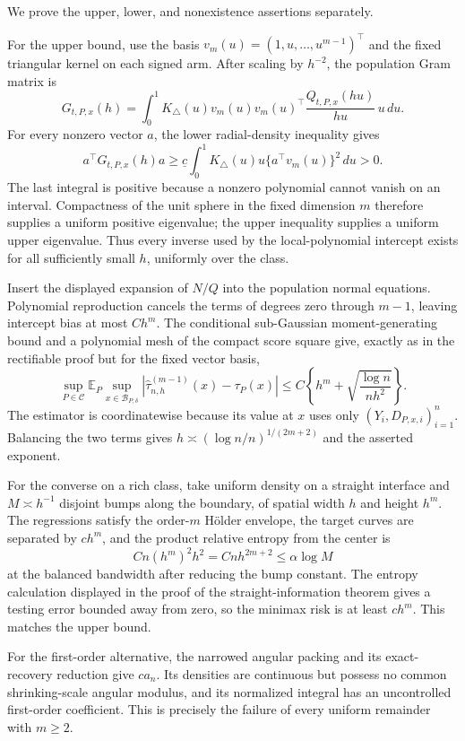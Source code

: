 We prove the upper, lower, and nonexistence assertions separately.

For the upper bound, use the basis \(v_m(u)=(1,u,\ldots,u^{m-1})^\top\) and the fixed triangular kernel on each signed arm.  After scaling by \(h^{-2}\), the population Gram matrix is
\[
 G_{t,P,x}(h)=\int_0^1K_\triangle(u)v_m(u)v_m(u)^\top\frac{Q_{t,P,x}(hu)}{hu}\,u\,du.
\]
For every nonzero vector \(a\), the lower radial-density inequality gives
\[
 a^\top G_{t,P,x}(h)a
 \geq\underline c\int_0^1K_\triangle(u)u\{a^\top v_m(u)\}^2\,du>0.
\]
The last integral is positive because a nonzero polynomial cannot vanish on an interval.  Compactness of the unit sphere in the fixed dimension \(m\) therefore supplies a uniform positive eigenvalue; the upper inequality supplies a uniform upper eigenvalue.  Thus every inverse used by the local-polynomial intercept exists for all sufficiently small \(h\), uniformly over the class.

Insert the displayed expansion of \(N/Q\) into the population normal equations.  Polynomial reproduction cancels the terms of degrees zero through \(m-1\), leaving intercept bias at most \(C h^m\).  The conditional sub-Gaussian moment-generating bound and a polynomial mesh of the compact score square give, exactly as in the rectifiable proof but for the fixed vector basis,
\[
 \sup_{P\in\mathcal C}\mathbb E_P\sup_{x\in\mathcal B_{P,\delta}}
 |\widehat\tau_{n,h}^{(m-1)}(x)-\tau_P(x)|
 \leq C\left\{h^m+\sqrt{\frac{\log n}{nh^2}}\right\}.
\]
The estimator is coordinatewise because its value at \(x\) uses only \((Y_i,D_{P,x,i})_{i=1}^n\).  Balancing the two terms gives
\(h\asymp(\log n/n)^{1/(2m+2)}\) and the asserted exponent.

For the converse on a rich class, take uniform density on a straight interface and \(M\asymp h^{-1}\) disjoint bumps along the boundary, of spatial width \(h\) and height \(h^m\).  The regressions satisfy the order-\(m\) H\"older envelope, the target curves are separated by \(ch^m\), and the product relative entropy from the center is
\[
 Cn(h^m)^2h^2=Cnh^{2m+2}\leq\alpha\log M
\]
at the balanced bandwidth after reducing the bump constant.  The entropy calculation displayed in the proof of the straight-information theorem gives a testing error bounded away from zero, so the minimax risk is at least \(ch^m\).  This matches the upper bound.

For the first-order alternative, the narrowed angular packing and its exact-recovery reduction give \(ca_n\).  Its densities are continuous but possess no common shrinking-scale angular modulus, and its normalized integral has an uncontrolled first-order coefficient.  This is precisely the failure of every uniform remainder with \(m\geq2\).

